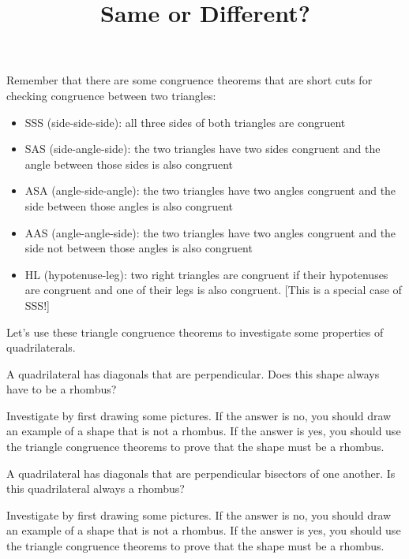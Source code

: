 \documentclass[nooutcomes,noauthor, handout]{ximera}
\title{Same or Different?}
\begin{document}
\begin{abstract}\end{abstract}
\maketitle


Remember that there are some congruence theorems that are short cuts for checking congruence between two triangles:
\begin{itemize}
\item SSS (side-side-side): all three sides of both triangles are congruent
\item SAS (side-angle-side): the two triangles have two sides congruent and the angle between those sides is also congruent
\item ASA (angle-side-angle): the two triangles have two angles congruent and the side between those angles is also congruent
\item AAS (angle-angle-side): the two triangles have two angles congruent and the side not between those angles is also congruent
\item HL (hypotenuse-leg): two right triangles are congruent if their hypotenuses are congruent and one of their legs is also congruent. [This is a special case of SSS!]
\end{itemize}


Let's use these triangle congruence theorems to investigate some properties of quadrilaterals.


\begin{problem}
	A quadrilateral has diagonals that are perpendicular. Does this shape always have to be a rhombus? 
	
	Investigate by first drawing some pictures. If the answer is no, you should draw an example of a shape that is not a rhombus. If the answer is yes, you should use the triangle congruence theorems to prove that the shape must be a rhombus.
 
\end{problem}


\begin{problem}
A quadrilateral has diagonals that are perpendicular bisectors of one another. Is this quadrilateral always a rhombus?


Investigate by first drawing some pictures. If the answer is no, you should draw an example of a shape that is not a rhombus. If the answer is yes, you should use the triangle congruence theorems to prove that the shape must be a rhombus.
\end{problem}
\end{document}
